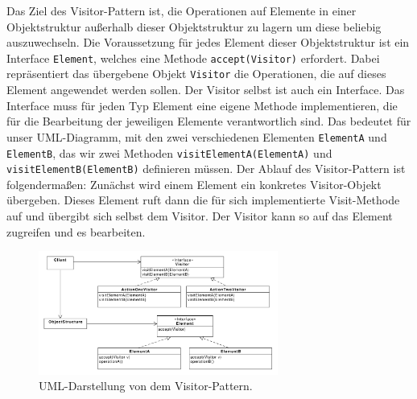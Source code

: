 
Das Ziel des Visitor-Pattern ist, die Operationen auf Elemente in einer Objektstruktur außerhalb dieser Objektstruktur zu lagern um diese beliebig auszuwechseln.
Die Voraussetzung für jedes Element dieser Objektstruktur ist ein Interface \texttt{Element}, welches eine Methode \texttt{accept(Visitor)} erfordert. Dabei repräsentiert das übergebene Objekt \texttt{Visitor} die Operationen, die auf dieses Element angewendet werden sollen. Der Visitor selbst ist auch ein Interface. Das Interface muss für jeden Typ Element eine eigene Methode implementieren, die für die Bearbeitung der jeweiligen Elemente verantwortlich sind. Das bedeutet für unser UML-Diagramm, mit den zwei verschiedenen Elementen \texttt{ElementA} und \texttt{ElementB}, das wir zwei Methoden \texttt{visitElementA(ElementA)} und \texttt{visitElementB(ElementB)} definieren müssen. 
Der Ablauf des Visitor-Pattern ist folgendermaßen: Zunächst wird einem Element ein konkretes Visitor-Objekt übergeben. Dieses Element ruft dann die für sich implementierte Visit-Methode auf und übergibt sich selbst dem Visitor. Der Visitor kann so auf das Element zugreifen und es bearbeiten.

\begin{figure}[htbp]
\centering
\includegraphics[width=0.7\textwidth]{./paper/visitor/visitor}
\caption{UML-Darstellung von dem Visitor-Pattern.}
\label{visitordiagramm}
\end{figure} 
